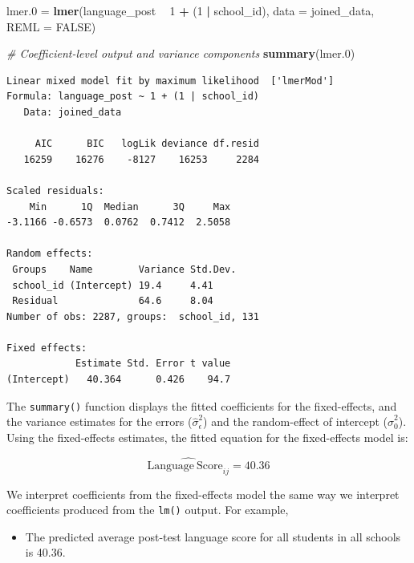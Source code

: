 \documentclass[]{book}
\newenvironment{Shaded}{\begin{snugshade}}{\end{snugshade}}
\newcommand{\CommentTok}[1]{\textcolor[rgb]{0.56,0.35,0.01}{\textit{#1}}}
\newcommand{\DataTypeTok}[1]{\textcolor[rgb]{0.13,0.29,0.53}{#1}}
\newcommand{\DecValTok}[1]{\textcolor[rgb]{0.00,0.00,0.81}{#1}}
\newcommand{\FloatTok}[1]{\textcolor[rgb]{0.00,0.00,0.81}{#1}}
\newcommand{\KeywordTok}[1]{\textcolor[rgb]{0.13,0.29,0.53}{\textbf{#1}}}
\newcommand{\NormalTok}[1]{#1}
\newcommand{\OperatorTok}[1]{\textcolor[rgb]{0.81,0.36,0.00}{\textbf{#1}}}
\newcommand{\OtherTok}[1]{\textcolor[rgb]{0.56,0.35,0.01}{#1}}
\newcommand{\StringTok}[1]{\textcolor[rgb]{0.31,0.60,0.02}{#1}}
\providecommand{\tightlist}{%
  \setlength{\itemsep}{0pt}\setlength{\parskip}{0pt}}
\begin{document}
\begin{Shaded}
\begin{Highlighting}[]
\NormalTok{lmer}\FloatTok{.0}\NormalTok{ =}\StringTok{ }\KeywordTok{lmer}\NormalTok{(language_post }\OperatorTok{~}\StringTok{ }\DecValTok{1} \OperatorTok{+}\StringTok{ }\NormalTok{(}\DecValTok{1} \OperatorTok{|}\StringTok{ }\NormalTok{school_id), }\DataTypeTok{data =}\NormalTok{ joined_data, }\DataTypeTok{REML =} \OtherTok{FALSE}\NormalTok{)}

\CommentTok{# Coefficient-level output and variance components}
\KeywordTok{summary}\NormalTok{(lmer}\FloatTok{.0}\NormalTok{)}
\end{Highlighting}
\end{Shaded}

\begin{verbatim}
Linear mixed model fit by maximum likelihood  ['lmerMod']
Formula: language_post ~ 1 + (1 | school_id)
   Data: joined_data

     AIC      BIC   logLik deviance df.resid 
   16259    16276    -8127    16253     2284 

Scaled residuals: 
    Min      1Q  Median      3Q     Max 
-3.1166 -0.6573  0.0762  0.7412  2.5058 

Random effects:
 Groups    Name        Variance Std.Dev.
 school_id (Intercept) 19.4     4.41    
 Residual              64.6     8.04    
Number of obs: 2287, groups:  school_id, 131

Fixed effects:
            Estimate Std. Error t value
(Intercept)   40.364      0.426    94.7
\end{verbatim}

The \texttt{summary()} function displays the fitted coefficients for the fixed-effects, and the variance estimates for the errors (\(\hat\sigma^2_{\epsilon}\)) and the random-effect of intercept (\(\hat\sigma^2_0\)). Using the fixed-effects estimates, the fitted equation for the fixed-effects model is:

\[
\hat{\mathrm{Language~Score}_{ij}} = 40.36
\]

We interpret coefficients from the fixed-effects model the same way we interpret coefficients produced from the \texttt{lm()} output. For example,

\begin{itemize}
\tightlist
\item
  The predicted average post-test language score for all students in all schools is 40.36.
\end{itemize}
\end{document}
